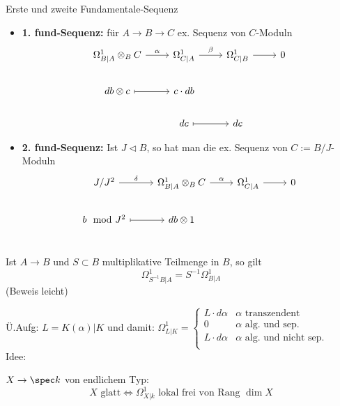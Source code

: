 \begin{satz}{Erste und zweite Fundamentale-Sequenz}
  \begin{itemize}
    \item \textbf{1. fund-Sequenz:}
      für $A\rightarrow B\rightarrow C$ ex. Sequenz von $C$-Moduln
      \[\begin{tikzcd}
        \Omega_{B|A}^1\otimes_BC\rar{\alpha} & \Omega_{C|A}^1 \rar{\beta}
          & \Omega_{C|B}^1 \rar & 0\\
          db\otimes c \rar[mapsto] & c\cdot db\\
                                   & dc \rar[mapsto] & dc
      \end{tikzcd}\]
    \item \textbf{2. fund-Sequenz:} Ist $J\vartriangleleft B$, so hat man die
    ex. Sequenz von $C:=B/J$-Moduln
      \[\begin{tikzcd}
        J/J^2 \rar{\delta} & \Omega_{B|A}^1\otimes_BC\rar{\alpha} 
          & \Omega_{C|A}^1 \rar & 0\\
          b\mod J^2 \rar[mapsto] & db\otimes 1 \\
      \end{tikzcd}\]
  \end{itemize}
\end{satz}
\begin{lemma}
Ist $A\rightarrow B$ und $S\subset B$ multiplikative Teilmenge in $B$, so gilt
\[
\Omega_{S^{-1}B|A}^1=S^{-1}\Omega_{B|A}^1
\]
(Beweis leicht)
\end{lemma}
Ü.Aufg: $L=K(\alpha)|K$ und damit: $\Omega_{L|K}^1=\begin{cases}
L\cdot d\alpha & \text{$\alpha$ transzendent}\\
0 & \text{$\alpha$ alg. und sep.}\\
L\cdot d\alpha & \text{$\alpha$ alg. und nicht sep.}\\
\end{cases}$\\
Idee: \TODO
\begin{bemerkung}
$X\rightarrow \spec k$ von endlichem Typ:
\[
X\text{ glatt}\Leftrightarrow\Omega_{X|k}^1\text{ lokal frei von Rang $\dim X$}
\]
\end{bemerkung}
